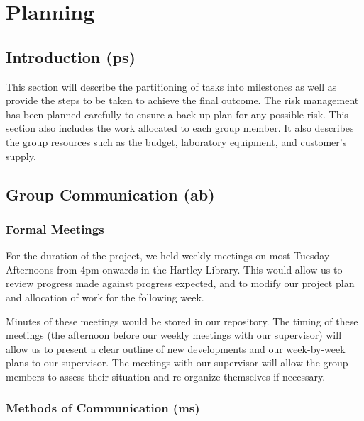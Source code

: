 \chapter{Planning}

\section{Introduction (ps)}
This section will describe the partitioning of tasks into milestones as well as provide the steps to be taken to achieve the final outcome.
The risk management has been planned carefully to ensure a back up plan for any possible risk.
This section also includes the work allocated to each group member.
It also describes the group resources such as the budget, laboratory equipment, and customer's supply. 








\section{Group Communication (ab)}
\label{group_comms}

\subsection{Formal Meetings}
\label{formal meetings}
For the duration of the project, we held weekly meetings on most Tuesday 
Afternoons from 4pm onwards in the Hartley Library. This would allow us to 
review progress made against progress expected, and to modify our project 
plan and allocation of work for the following week.

Minutes of these meetings would be stored in our repository.
The timing of these meetings (the afternoon before our weekly meetings with our 
supervisor) will allow us to present a clear outline 
of new developments and our week-by-week plans to our supervisor.
The meetings with our supervisor will allow the group members to assess their situation
and re-organize themselves if necessary.

\subsection{Methods of Communication (ms)}

